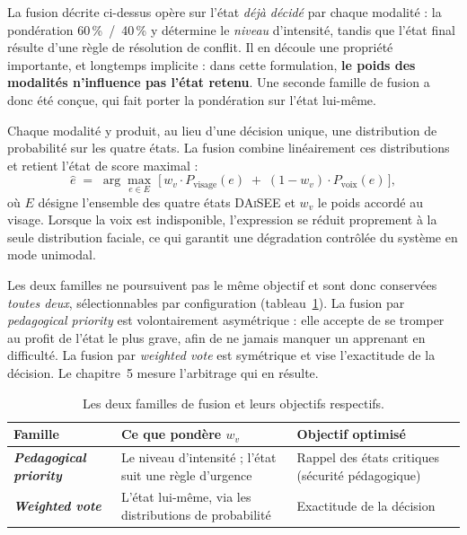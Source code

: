 La fusion décrite ci-dessus opère sur l'état \emph{déjà décidé} par chaque
modalité : la pondération 60\,\%~/~40\,\% y détermine le \emph{niveau}
d'intensité, tandis que l'état final résulte d'une règle de résolution de conflit.
Il en découle une propriété importante, et longtemps implicite : dans cette
formulation, \textbf{le poids des modalités n'influence pas l'état retenu}. Une
seconde famille de fusion a donc été conçue, qui fait porter la pondération sur
l'état lui-même.

Chaque modalité y produit, au lieu d'une décision unique, une distribution de
probabilité sur les quatre états. La fusion combine linéairement ces distributions
et retient l'état de score maximal :
\[
  \hat{e} \;=\; \arg\max_{e \in E}\;
  \Big[\, w_v \cdot P_{\mathrm{visage}}(e)
        \;+\; (1 - w_v) \cdot P_{\mathrm{voix}}(e) \,\Big],
\]
où $E$ désigne l'ensemble des quatre états \textsc{DAiSEE} et $w_v$ le poids
accordé au visage. Lorsque la voix est indisponible, l'expression se réduit
proprement à la seule distribution faciale, ce qui garantit une dégradation
contrôlée du système en mode unimodal.

Les deux familles ne poursuivent pas le même objectif et sont donc conservées
\emph{toutes deux}, sélectionnables par configuration
(tableau~\ref{tab:familles-fusion}). La fusion par \emph{pedagogical priority} est
volontairement asymétrique : elle accepte de se tromper au profit de l'état le
plus grave, afin de ne jamais manquer un apprenant en difficulté. La fusion par
\emph{weighted vote} est symétrique et vise l'exactitude de la décision. Le chapitre~5 mesure
l'arbitrage qui en résulte.

\begin{table}[H]
\centering
\renewcommand{\arraystretch}{1.2}
\begin{tabular}{>{\bfseries}l >{\raggedright\arraybackslash}p{4.4cm}
                >{\raggedright\arraybackslash}p{4.4cm}}
\toprule
Famille & Ce que pondère $w_v$ & Objectif optimisé \\
\midrule
\emph{Pedagogical priority} & Le niveau d'intensité ; l'état suit une règle d'urgence &
Rappel des états critiques (sécurité pédagogique) \\
\emph{Weighted vote} & L'état lui-même, via les distributions de probabilité &
Exactitude de la décision \\
\bottomrule
\end{tabular}
\caption{Les deux familles de fusion et leurs objectifs respectifs.}
\label{tab:familles-fusion}
\end{table}

